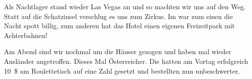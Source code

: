 Als Nachtlager stand wieder Las Vegas an und so machten wir uns auf den Weg.
Statt auf die Schatzinsel verschlug es uns zum Zirkus.
Im  war zum einen die Nacht spott billig, zum anderen hat das Hotel einen eigenen Freizeitpark mit Achterbahnen!

Am Abend sind wir nochmal um die Häuser gezogen und haben mal wieder Ausländer angetroffen.
Dieses Mal Österreicher.
Die hatten am Vortag erfolgreich 10~\$ am Roulettetisch auf eine Zahl gesetzt und bestellten nun unbeschwerter.
